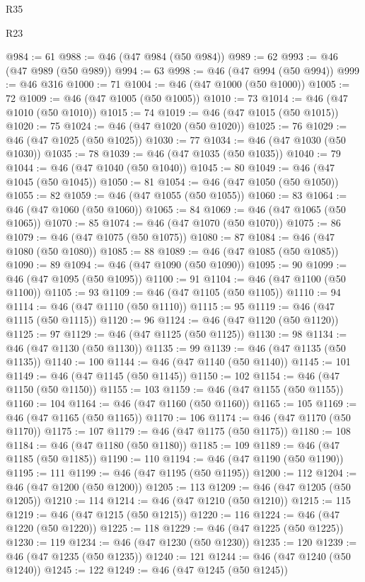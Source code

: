 \begin{lexlean}{R35}
\begin{lexlean}{R23}
\begin{coremodule}
{{{{{{{{{{{{{{{{{{{{{@984 := 61
@988 := @46 (@47 @984 (@50 @984))
@989 := 62
@993 := @46 (@47 @989 (@50 @989))
@994 := 63
@998 := @46 (@47 @994 (@50 @994))
@999 := @46 @316
@1000 := 71
@1004 := @46 (@47 @1000 (@50 @1000))
@1005 := 72
@1009 := @46 (@47 @1005 (@50 @1005))
@1010 := 73
@1014 := @46 (@47 @1010 (@50 @1010))
@1015 := 74
@1019 := @46 (@47 @1015 (@50 @1015))
@1020 := 75
@1024 := @46 (@47 @1020 (@50 @1020))
@1025 := 76
@1029 := @46 (@47 @1025 (@50 @1025))
@1030 := 77
@1034 := @46 (@47 @1030 (@50 @1030))
@1035 := 78
@1039 := @46 (@47 @1035 (@50 @1035))
@1040 := 79
@1044 := @46 (@47 @1040 (@50 @1040))
@1045 := 80
@1049 := @46 (@47 @1045 (@50 @1045))
@1050 := 81
@1054 := @46 (@47 @1050 (@50 @1050))
@1055 := 82
@1059 := @46 (@47 @1055 (@50 @1055))
@1060 := 83
@1064 := @46 (@47 @1060 (@50 @1060))
@1065 := 84
@1069 := @46 (@47 @1065 (@50 @1065))
@1070 := 85
@1074 := @46 (@47 @1070 (@50 @1070))
@1075 := 86
@1079 := @46 (@47 @1075 (@50 @1075))
@1080 := 87
@1084 := @46 (@47 @1080 (@50 @1080))
@1085 := 88
@1089 := @46 (@47 @1085 (@50 @1085))
@1090 := 89
@1094 := @46 (@47 @1090 (@50 @1090))
@1095 := 90
@1099 := @46 (@47 @1095 (@50 @1095))
@1100 := 91
@1104 := @46 (@47 @1100 (@50 @1100))
@1105 := 93
@1109 := @46 (@47 @1105 (@50 @1105))
@1110 := 94
@1114 := @46 (@47 @1110 (@50 @1110))
@1115 := 95
@1119 := @46 (@47 @1115 (@50 @1115))
@1120 := 96
@1124 := @46 (@47 @1120 (@50 @1120))
@1125 := 97
@1129 := @46 (@47 @1125 (@50 @1125))
@1130 := 98
@1134 := @46 (@47 @1130 (@50 @1130))
@1135 := 99
@1139 := @46 (@47 @1135 (@50 @1135))
@1140 := 100
@1144 := @46 (@47 @1140 (@50 @1140))
@1145 := 101
@1149 := @46 (@47 @1145 (@50 @1145))
@1150 := 102
@1154 := @46 (@47 @1150 (@50 @1150))
@1155 := 103
@1159 := @46 (@47 @1155 (@50 @1155))
@1160 := 104
@1164 := @46 (@47 @1160 (@50 @1160))
@1165 := 105
@1169 := @46 (@47 @1165 (@50 @1165))
@1170 := 106
@1174 := @46 (@47 @1170 (@50 @1170))
@1175 := 107
@1179 := @46 (@47 @1175 (@50 @1175))
@1180 := 108
@1184 := @46 (@47 @1180 (@50 @1180))
@1185 := 109
@1189 := @46 (@47 @1185 (@50 @1185))
@1190 := 110
@1194 := @46 (@47 @1190 (@50 @1190))
@1195 := 111
@1199 := @46 (@47 @1195 (@50 @1195))
@1200 := 112
@1204 := @46 (@47 @1200 (@50 @1200))
@1205 := 113
@1209 := @46 (@47 @1205 (@50 @1205))
@1210 := 114
@1214 := @46 (@47 @1210 (@50 @1210))
@1215 := 115
@1219 := @46 (@47 @1215 (@50 @1215))
@1220 := 116
@1224 := @46 (@47 @1220 (@50 @1220))
@1225 := 118
@1229 := @46 (@47 @1225 (@50 @1225))
@1230 := 119
@1234 := @46 (@47 @1230 (@50 @1230))
@1235 := 120
@1239 := @46 (@47 @1235 (@50 @1235))
@1240 := 121
@1244 := @46 (@47 @1240 (@50 @1240))
@1245 := 122
@1249 := @46 (@47 @1245 (@50 @1245))
}}}}}}}}}}}}}}}}}}}}}
\end{coremodule}
\end{lexlean}
\end{lexlean}
